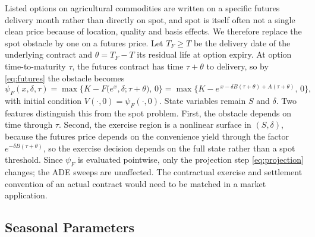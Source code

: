 \documentclass[12pt,a4paper]{article}
\begin{document}
Listed options on agricultural commodities are written on a specific futures delivery month rather than directly on spot, and spot is itself often not a single clean price because of location, quality and basis effects. We therefore replace the spot obstacle by one on a futures price. Let $T_F\ge T$ be the delivery date of the underlying contract and $\theta=T_F-T$ its residual life at option expiry. At option time-to-maturity $\tau$, the futures contract has time $\tau+\theta$ to delivery, so by \eqref{eq:futures} the obstacle becomes
\begin{equation}
\psi_F(x,\delta,\tau)=\max\Big\{K-F\big(e^x,\delta;\tau+\theta\big),\,0\Big\}=\max\Big\{K-e^{\,x-\delta B(\tau+\theta)+A(\tau+\theta)},\,0\Big\},
\end{equation}
with initial condition $V(\cdot,0)=\psi_F(\cdot,0)$. State variables remain $S$ and $\delta$. Two features distinguish this from the spot problem. First, the obstacle depends on time through $\tau$. Second, the exercise region is a nonlinear surface in $(S,\delta)$, because the futures price depends on the convenience yield through the factor $e^{-\delta B(\tau+\theta)}$, so the exercise decision depends on the full state rather than a spot threshold. Since $\psi_F$ is evaluated pointwise, only the projection step \eqref{eq:projection} changes; the ADE sweeps are unaffected. The contractual exercise and settlement convention of an actual contract would need to be matched in a market application.

\subsection{Seasonal Parameters}\label{sec:season}
\end{document}
